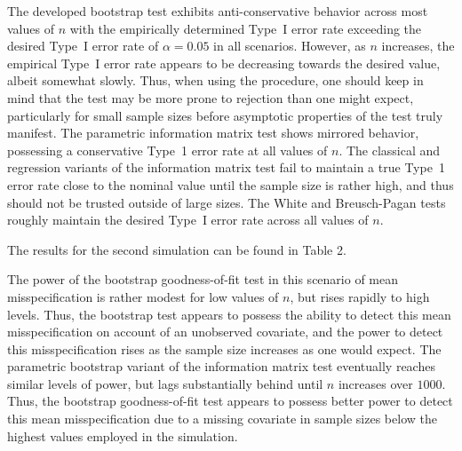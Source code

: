 \documentclass[submit]{smj}
\begin{document}
The developed bootstrap test exhibits anti-conservative behavior across most values of $n$ with the empirically determined Type~I error rate exceeding the desired Type~I error rate
of $\alpha = 0.05$ in all scenarios. However, as $n$ increases, the empirical Type~I error rate appears to be decreasing towards the desired value, albeit somewhat slowly. Thus, when
using the procedure, one should keep in mind that the test may be more prone to
rejection than one might expect, particularly for small sample sizes before asymptotic properties of the test truly manifest. The parametric information matrix test shows mirrored behavior,
possessing a conservative Type~1 error rate at all values of $n$. The classical and regression variants of the information matrix test fail to maintain a true Type~1 error rate close
to the nominal value until the sample size is rather high, and thus should not be trusted outside of large sizes. The White and Breusch-Pagan tests roughly maintain the desired Type~I error rate across all values of $n$.

The results for the second simulation can be found in Table 2.

\begin{table}[H]
	\centering
	\small\addtolength{\tabcolsep}{-3pt}
	\setlength\extrarowheight{-3pt}
	{
	}
	\end{table}

The power of the bootstrap goodness-of-fit test in this scenario of mean misspecification is rather modest for low values of $n$, but rises rapidly to high levels. Thus, the bootstrap test appears to possess the
ability to detect this mean misspecification on account of an unobserved covariate, and the power to detect this misspecification rises as the sample size increases as one would expect.
The parametric bootstrap variant of the information matrix test eventually reaches similar levels of power, but lags substantially behind until $n$ increases over $1000$. Thus, the bootstrap
goodness-of-fit test appears to possess better power to detect this mean misspecification due to a missing covariate in sample sizes below the highest values employed in the simulation.
\end{document}
